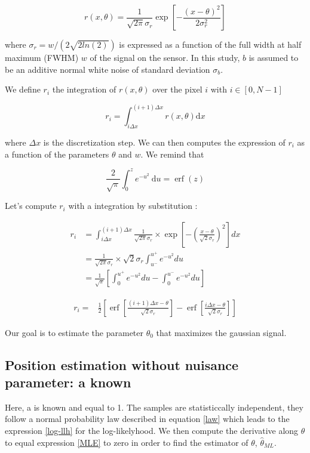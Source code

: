 \documentclass[10pt,letterpaper]{article}
\begin{document}
\begin{equation}
     r(x, \theta)=\frac{1}{\sqrt{2 \pi} \sigma_{r}} \exp \left[-\frac{(x-\theta)^{2}}{2 \sigma_{r}^{2}}\right]     
\end{equation}


where $\sigma_{r} = w/(2\sqrt{2ln(2)})$ is expressed as a function of the full width at half maximum (FWHM) $w$ of the signal on the sensor. In this study, $b$ is assumed to be an additive normal white noise of standard deviation $\sigma_{b}$.

We define $r_{i}$ the integration of $r(x, \theta)$ over the pixel $i$ with $i \in[0, N-1]$


\begin{equation}
     r_{i}=\int_{i \Delta x}^{(i+1) \Delta x} r(x, \theta) \mathrm{d} x
\end{equation}


where $\Delta x$ is the discretization step. We can then computes the expression of $r_{i}$ as a function of the parameters $\theta$ and $w$. We remind that


\begin{equation*}
\frac{2}{\sqrt{\pi}} \int_{0}^{z} e^{-u^{2}} \mathrm{~d} u=\operatorname{erf}(z)
\end{equation*}

\pagebreak

Let's compute $r_i$ with a integration by substitution :


\begin{align}
     r_i & =\int_{i \Delta x}^{(i+1) \Delta x} \frac{1}{\sqrt{2 \pi} \sigma_r} \times \exp \left[-\left(\frac{x-\theta}{\sqrt{2} \sigma_r}\right)^2\right] d x \\
     & =\frac{1}{\sqrt{2 \pi} \sigma_r} \times \sqrt{2} \sigma_r \int_{u^{-}}^{u^{+}} e^{-u^2} d u \\
     & =\frac{1}{\sqrt{\pi}}\left[\int_0^{u^{+}} e^{-u^2} d u-\int_0^{u^{-}} e^{-u^2} d u\right]
\end{align}

\begin{align}
r_i= & \frac{1}{2}\left[\operatorname{erf}\left[\frac{(i+1) \Delta x-\theta}{\sqrt{2} \sigma_r}\right]-\operatorname{erf}\left[\frac{i \Delta x-\theta}{\sqrt{2} \sigma_r}\right]\right]
\end{align}

Our goal is to estimate the parameter $\theta_0$ that maximizes the gaussian signal.

\subsection{Position estimation without nuisance parameter: a known}
Here, a is known and equal to 1. The samples are statisticcally independent, they follow a normal probability law described in equation \ref{law} which leads to the expression \ref{log-llh} for the log-likelyhood. We then compute the derivative along $\theta$ to equal expression \ref{MLE} to zero in order to find the estimator of $\theta$, $\hat{\theta}_{ML}$.
\end{document}
